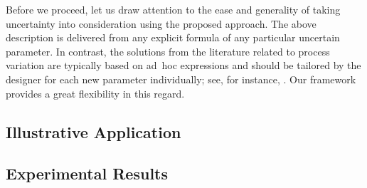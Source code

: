 Before we proceed, let us draw attention to the ease and generality of taking
uncertainty into consideration using the proposed approach. The above
description is delivered from any explicit formula of any particular uncertain
parameter. In contrast, the solutions from the literature related to process
variation are typically based on ad~hoc expressions and should be tailored by
the designer for each new parameter individually; see, for instance,
\cite{ghanta2006, bhardwaj2008, huang2009a}. Our framework provides a great
flexibility in this regard.

\subsection{Illustrative Application}

\subsection{Experimental Results}

